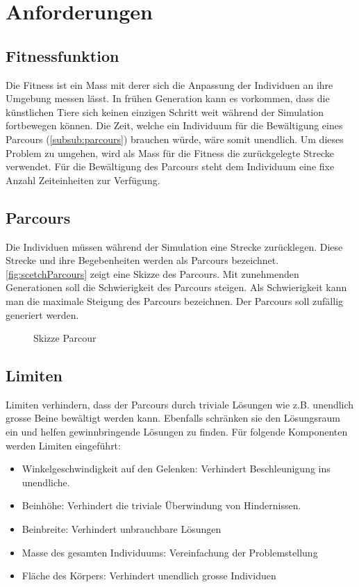   \section{Anforderungen}

    \subsection{Fitnessfunktion}

      Die Fitness ist ein Mass mit derer sich die Anpassung der Individuen an ihre Umgebung messen lässt.
      In frühen Generation kann es vorkommen, dass die künstlichen Tiere sich keinen einzigen Schritt weit während der Simulation
      fortbewegen können. Die Zeit, welche ein Individuum für die Bewältigung eines Parcours (\vref{subsub:parcours}) brauchen würde, wäre somit unendlich.
      Um dieses Problem zu umgehen, wird als Mass für die Fitness die zurückgelegte Strecke verwendet.
      Für die Bewältigung des Parcours steht dem Individuum eine fixe Anzahl Zeiteinheiten zur Verfügung.

    \subsection{Parcours\label{subsub:parcours}}

      Die Individuen müssen während der Simulation eine Strecke zurücklegen.
      Diese Strecke und ihre Begebenheiten werden als Parcours bezeichnet.
      \vref{fig:scetchParcours} zeigt eine Skizze des Parcours.
      Mit zunehmenden Generationen soll die Schwierigkeit des Parcours steigen.
      Als Schwierigkeit kann man die maximale Steigung des Parcours bezeichnen.
      Der Parcours soll zufällig generiert werden.

      \begin{figure}[H]
        
        \caption{Skizze Parcour\label{fig:scetchParcours}}
      \end{figure}

    \subsection{Limiten\label{sub:IntroReqLimit}}

      Limiten verhindern, dass der Parcours durch triviale Lösungen wie z.B. unendlich grosse Beine bewältigt werden kann.
      Ebenfalls schränken sie den Lösungsraum ein und helfen gewinnbringende Lösungen zu finden.
      Für folgende Komponenten werden Limiten eingeführt:
      \begin{itemize}
        \item Winkelgeschwindigkeit auf den Gelenken: Verhindert Beschleunigung ins unendliche.
        \item Beinhöhe: Verhindert die triviale Überwindung von Hindernissen.
        \item Beinbreite: Verhindert unbrauchbare Lösungen
        \item Masse des gesamten Individuums: Vereinfachung der Problemstellung
        \item Fläche des Körpers: Verhindert unendlich grosse Individuen
      \end{itemize}

